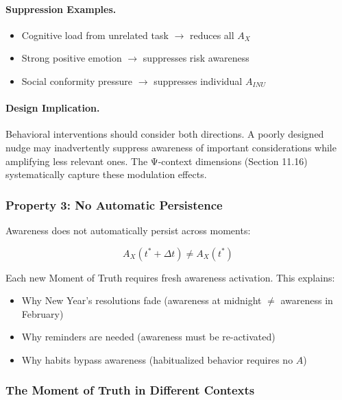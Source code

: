 \paragraph{Suppression Examples.}
\begin{itemize}
    \item Cognitive load from unrelated task $\rightarrow$ reduces all $A_X$
    \item Strong positive emotion $\rightarrow$ suppresses risk awareness
    \item Social conformity pressure $\rightarrow$ suppresses individual $A_{INU}$
\end{itemize}

\paragraph{Design Implication.}
Behavioral interventions should consider both directions. A poorly designed 
nudge may inadvertently suppress awareness of important considerations while 
amplifying less relevant ones. The Ψ-context dimensions (Section 11.16) 
systematically capture these modulation effects.

\subsubsection{Property 3: No Automatic Persistence}

Awareness does not automatically persist across moments:

\begin{equation}
A_X(t^* + \Delta t) \neq A_X(t^*)
\end{equation}

Each new Moment of Truth requires fresh awareness activation. This explains:
\begin{itemize}
\item Why New Year's resolutions fade (awareness at midnight $\neq$ awareness in February)
\item Why reminders are needed (awareness must be re-activated)
\item Why habits bypass awareness (habitualized behavior requires no $A$)
\end{itemize}

\subsubsection{The Moment of Truth in Different Contexts}

